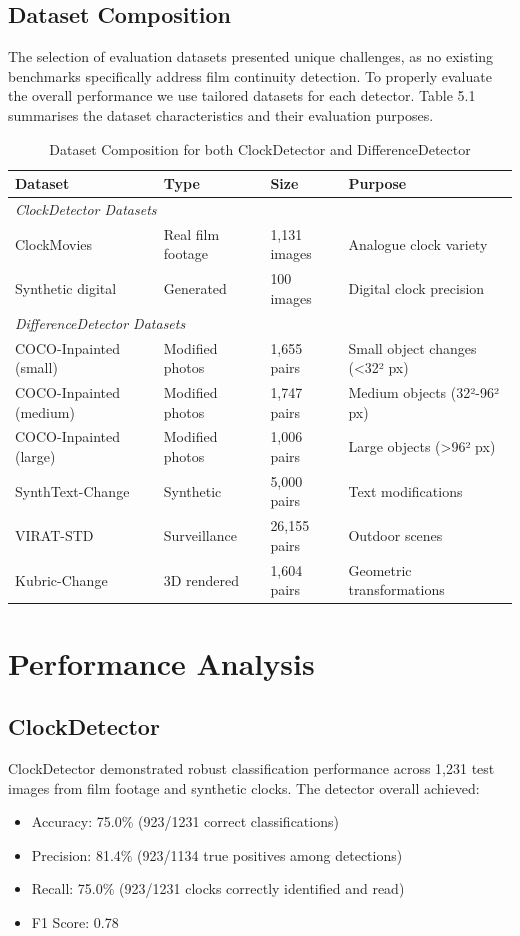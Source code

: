 \subsection{Dataset Composition}
The selection of evaluation datasets presented unique challenges, as no existing benchmarks specifically address film continuity detection. To properly evaluate the overall performance we use tailored datasets for each detector. Table 5.1 summarises the dataset characteristics and their evaluation purposes.

\begin{table}[h]
\centering
\caption{Dataset Composition for both ClockDetector and DifferenceDetector}
\label{tab:datasets}
\begin{tabular}{llll}
\toprule
\textbf{Dataset} & \textbf{Type} & \textbf{Size} & \textbf{Purpose} \\
\midrule
\multicolumn{4}{l}{\textit{ClockDetector Datasets}} \\
ClockMovies & Real film footage & 1,131 images & Analogue clock variety \\
Synthetic digital & Generated & 100 images & Digital clock precision \\
\midrule
\multicolumn{4}{l}{\textit{DifferenceDetector Datasets}} \\
COCO-Inpainted (small) & Modified photos & 1,655 pairs & Small object changes (<32² px) \\
COCO-Inpainted (medium) & Modified photos & 1,747 pairs & Medium objects (32²-96² px) \\
COCO-Inpainted (large) & Modified photos & 1,006 pairs & Large objects (>96² px) \\
SynthText-Change & Synthetic & 5,000 pairs & Text modifications \\
VIRAT-STD & Surveillance & 26,155 pairs & Outdoor scenes \\
Kubric-Change & 3D rendered & 1,604 pairs & Geometric transformations \\
\bottomrule
\end{tabular}
\end{table}

\section{Performance Analysis}

\subsection{ClockDetector}
ClockDetector demonstrated robust classification performance across 1,231 test images from film footage and synthetic clocks. The detector overall achieved:
\begin{itemize}
\item Accuracy: 75.0\% (923/1231 correct classifications)
\item Precision: 81.4\% (923/1134 true positives among detections)
\item Recall: 75.0\% (923/1231 clocks correctly identified and read)
\item F1 Score: 0.78
\end{itemize}

